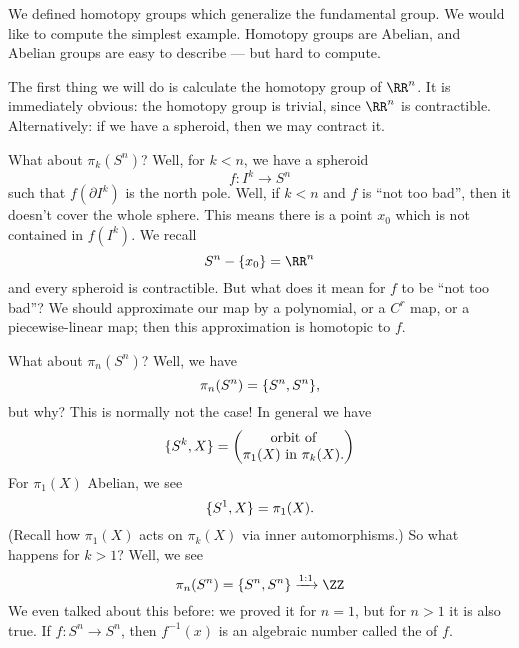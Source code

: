 We defined homotopy groups which generalize the fundamental
group. We would like to compute the simplest example. Homotopy
groups are Abelian, and Abelian groups are easy to describe ---
but hard to compute.

The first thing we will do is calculate the homotopy group of
$\RR^n$. It is immediately obvious: the homotopy group is
trivial, since $\RR^n$ is contractible. Alternatively: if we have
a spheroid, then we may contract it.

What about $\pi_{k}(S^{n})$? Well, for $k<n$, we have a spheroid
\begin{equation}
f\colon I^k\to S^n
\end{equation}
such that $f(\partial I^{k})$ is the north pole. Well, if $k<n$
and $f$ is ``not too bad'', then it doesn't cover the whole
sphere. This means there is a point $x_0$ which is not contained
in $f(I^k)$. We recall
\begin{equation}
S^{n}-\{x_0\}=\RR^n
\end{equation}
and every spheroid is contractible. But what does it mean for $f$
to be ``not too bad''? We should approximate our map by a
polynomial, or a $C^{r}$ map, or a piecewise-linear map; then
this approximation is homotopic to $f$.

What about $\pi_{n}(S^{n})$? Well, we have
\begin{equation}
\pi_{n}(S^{n})=\homotopyClass(S^n,S^n),
\end{equation}
but why? This is normally not the case! In general we have
\begin{equation}
\homotopyClass(S^k,X)=\begin{pmatrix}
\mbox{orbit of}\\
\pi_{1}(X)\mbox{ in }\pi_{k}(X).
\end{pmatrix}
\end{equation}
For $\pi_{1}(X)$ Abelian, we see
\begin{equation}
\homotopyClass(S^1,X)=\pi_{1}(X).
\end{equation}
(Recall how $\pi_{1}(X)$ acts on $\pi_{k}(X)$ via inner automorphisms.)
So what happens for $k>1$? Well, we see
\begin{equation}
\pi_{n}(S^{n})=\homotopyClass(S^n,S^n)\xrightarrow{1:1}\ZZ
\end{equation}
We even talked about this before: we proved it for $n=1$, but for
$n>1$ it is also true. If $f\colon S^n\to S^n$, then $f^{-1}(x)$
is an algebraic number called the  of $f$.

